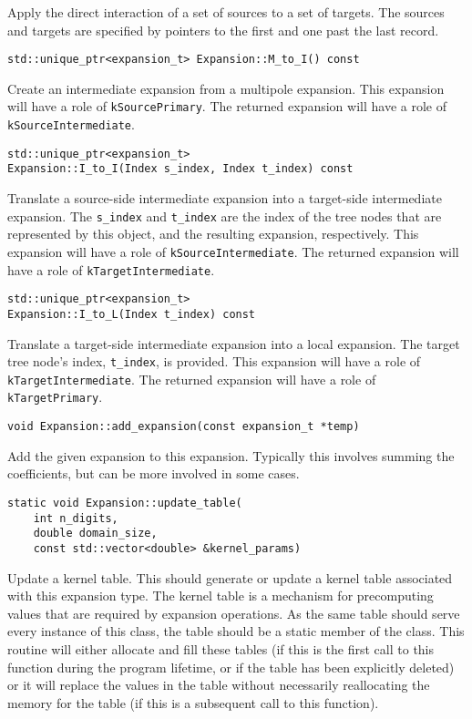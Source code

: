 \noindent Apply the direct interaction of a set of sources to a set of targets.
The sources and targets are specified by pointers to the first and one past the
last record.

\begin{lstlisting}
std::unique_ptr<expansion_t> Expansion::M_to_I() const
\end{lstlisting}

\noindent Create an intermediate expansion from a multipole expansion.
This expansion will have a role of \texttt{kSourcePrimary}.
The returned expansion will have a role of \texttt{kSourceIntermediate}.

\begin{lstlisting}
std::unique_ptr<expansion_t>
Expansion::I_to_I(Index s_index, Index t_index) const
\end{lstlisting}

\noindent Translate a source-side intermediate expansion into a target-side
intermediate expansion. The \texttt{s\_index} and \texttt{t\_index} are the
index of the tree nodes that are represented by this object, and the
resulting expansion, respectively.
This expansion will have a role of \texttt{kSourceIntermediate}.
The returned expansion will have a role of \texttt{kTargetIntermediate}.

\begin{lstlisting}
std::unique_ptr<expansion_t>
Expansion::I_to_L(Index t_index) const
\end{lstlisting}

\noindent Translate a target-side intermediate expansion into a local
expansion. The target tree node's index, \texttt{t\_index}, is provided.
This expansion will have a role of \texttt{kTargetIntermediate}.
The returned expansion will have a role of \texttt{kTargetPrimary}.

\begin{lstlisting}
void Expansion::add_expansion(const expansion_t *temp)
\end{lstlisting}

\noindent Add the given expansion to this expansion. Typically this involves
summing the coefficients, but can be more involved in some cases.

\begin{lstlisting}
static void Expansion::update_table(
    int n_digits,
    double domain_size,
    const std::vector<double> &kernel_params)
\end{lstlisting}

\noindent Update a kernel table. This should generate or update a kernel table
associated
with this expansion type. The kernel table is a mechanism for precomputing
values that are required by expansion operations. As the same table should
serve every instance of this class, the table should be a static member of the
class. This routine will either allocate and fill these tables (if this is the
first call to this function during the program lifetime, or if the table has
been explicitly deleted) or it will replace the values in the table without
necessarily reallocating the memory for the table (if this is a subsequent call
to this function).

